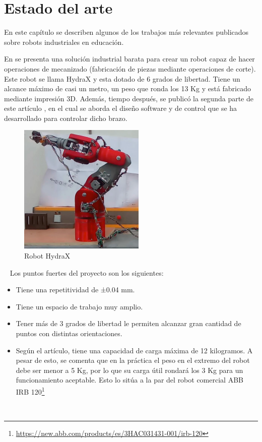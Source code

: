 \chapter{Estado del arte}
\label{cap:capitulo2}
\noindent En este capítulo se describen algunos de los trabajos más relevantes publicados sobre robots industriales en educación.

En \cite{KRIMPENIS2020103} se presenta una solución industrial barata para crear un robot capaz de hacer operaciones de mecanizado (fabricación 
de piezas mediante operaciones de corte). Este robot se llama HydraX y esta dotado de 6 grados de libertad. Tiene un alcance máximo de casi un metro, un 
peso que ronda los 13 Kg y está fabricado mediante impresión 3D. 
Además, tiempo después, se publicó la segunda parte de este artículo \cite{PAPAPASCHOS2020109}, en el cual se aborda el diseño software y de control 
que se ha desarrollado para controlar dicho brazo. \\
    \begin{figure} [h!]
        \begin{center}
          \includegraphics[width=6cm]{figs/Hydra.png}
        \end{center}
        \caption{Robot HydraX}
        \label{fig:hydra}
    \end{figure}\ 
    \newpage
    Los puntos fuertes del proyecto son los siguientes:
    \begin{itemize}
        \item Tiene una repetitividad de ±0.04 mm.
        \item Tiene un espacio de trabajo muy amplio.
        \item Tener más de 3 grados de libertad le permiten alcanzar gran cantidad de puntos con distintas orientaciones.
        \item Según el artículo, tiene una capacidad de carga máxima de 12 kilogramos. A pesar de esto, se comenta que en la práctica el peso en el 
        extremo del robot debe ser menor a 5 Kg, por lo que su carga útil rondará los 3 Kg para un funcionamiento aceptable. Esto lo sitúa a la par 
        del robot comercial ABB IRB 120\footnote{\url{https://new.abb.com/products/es/3HAC031431-001/irb-120}}  
    \end{itemize}\
    
